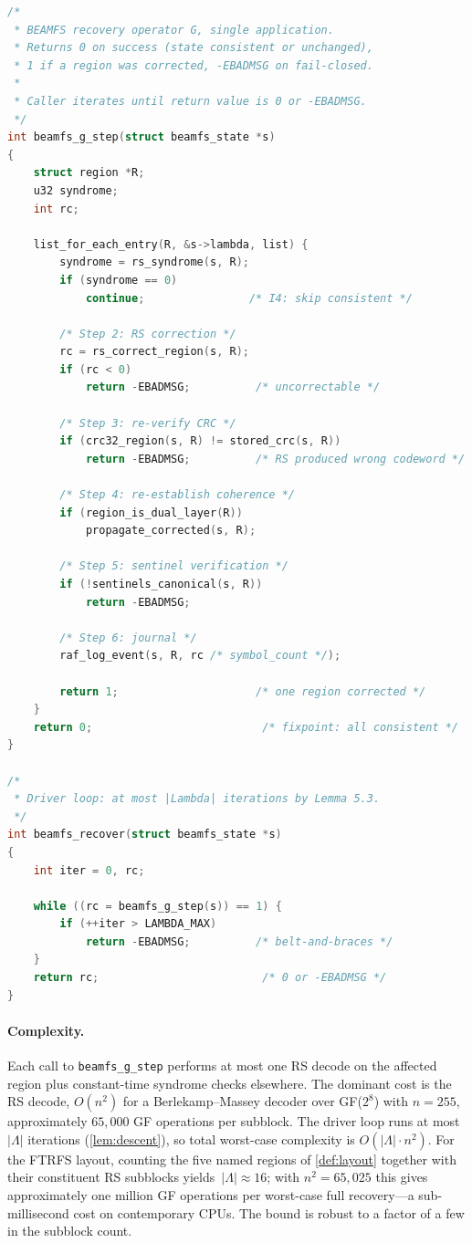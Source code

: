 \begin{lstlisting}[language=C,frame=single,
  basicstyle=\ttfamily\footnotesize]
/*
 * BEAMFS recovery operator G, single application.
 * Returns 0 on success (state consistent or unchanged),
 * 1 if a region was corrected, -EBADMSG on fail-closed.
 *
 * Caller iterates until return value is 0 or -EBADMSG.
 */
int beamfs_g_step(struct beamfs_state *s)
{
    struct region *R;
    u32 syndrome;
    int rc;

    list_for_each_entry(R, &s->lambda, list) {
        syndrome = rs_syndrome(s, R);
        if (syndrome == 0)
            continue;                /* I4: skip consistent */

        /* Step 2: RS correction */
        rc = rs_correct_region(s, R);
        if (rc < 0)
            return -EBADMSG;          /* uncorrectable */

        /* Step 3: re-verify CRC */
        if (crc32_region(s, R) != stored_crc(s, R))
            return -EBADMSG;          /* RS produced wrong codeword */

        /* Step 4: re-establish coherence */
        if (region_is_dual_layer(R))
            propagate_corrected(s, R);

        /* Step 5: sentinel verification */
        if (!sentinels_canonical(s, R))
            return -EBADMSG;

        /* Step 6: journal */
        raf_log_event(s, R, rc /* symbol_count */);

        return 1;                     /* one region corrected */
    }
    return 0;                          /* fixpoint: all consistent */
}

/*
 * Driver loop: at most |Lambda| iterations by Lemma 5.3.
 */
int beamfs_recover(struct beamfs_state *s)
{
    int iter = 0, rc;

    while ((rc = beamfs_g_step(s)) == 1) {
        if (++iter > LAMBDA_MAX)
            return -EBADMSG;          /* belt-and-braces */
    }
    return rc;                         /* 0 or -EBADMSG */
}
\end{lstlisting}

\paragraph{Complexity.}
Each call to \texttt{beamfs\_g\_step} performs at most one RS decode
on the affected region plus constant-time syndrome checks elsewhere.
The dominant cost is the RS decode, \(O(n^{2})\) for a
Berlekamp--Massey decoder over GF(\(2^{8}\)) with \(n=255\),
approximately \(65{,}000\) GF operations per subblock. The driver
loop runs at most \(|\Lambda|\) iterations
(\cref{lem:descent}), so total worst-case complexity is
\(O(|\Lambda| \cdot n^{2})\). For the FTRFS layout, counting the
five named regions of \cref{def:layout} together with their
constituent RS subblocks yields~\(|\Lambda| \approx 16\); with
\(n^{2} = 65{,}025\) this gives approximately one million GF
operations per worst-case full recovery---a sub-millisecond cost
on contemporary CPUs. The bound is robust to a factor of a few
in the subblock count.

